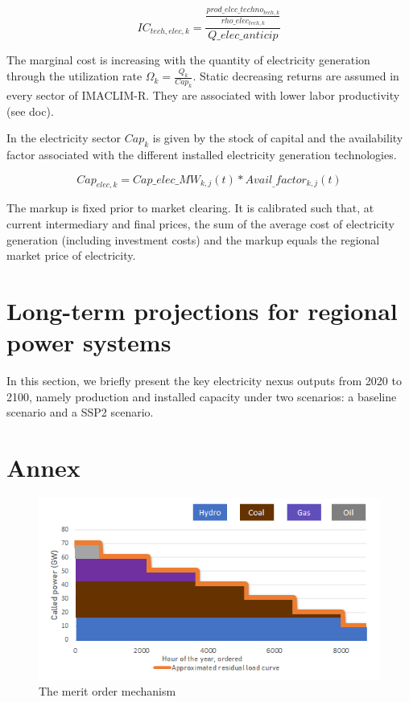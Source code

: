 \begin{dmath}
    IC_{tech,elec,k} = \frac{\frac{prod\_elec\_techno_{tech,k}}{rho\_elec_{tech,k}}}{Q\_elec\_anticip}
    \label{eqn:IC}
\end{dmath}

The marginal cost is increasing with the quantity of electricity generation through the utilization rate $\Omega_{k} = \frac{Q_{k}}{Cap_{k}}$. Static decreasing returns are assumed in every sector of IMACLIM-R. They are associated with lower labor productivity (see doc). %

 In the electricity sector $Cap_{k}$ is given by the stock of capital and the availability factor associated with the different installed electricity generation technologies.

\begin{dmath}
    Cap_{elec,k} =  Cap\_elec\_MW_{k,j}(t)*Avail_\_factor_{k,j}(t)
    \label{eqn:Cap}
\end{dmath}


The markup is fixed prior to market clearing. It is calibrated such that, at current intermediary and final prices, the sum of the average cost of electricity generation (including investment costs) and the markup equals the regional market price of electricity.
\section{Long-term projections for regional power systems}
In this section, we briefly present the key electricity nexus outputs from 2020 to 2100, namely production and installed capacity under two scenarios: a baseline scenario and a SSP2 scenario.

\newpage
\section{Annex}

\begin{figure}[H]
    \centering
    \includegraphics{figures&tables/dispatch.png}
    \caption{The merit order mechanism}
    \label{fig:dispatch}
\end{figure}

